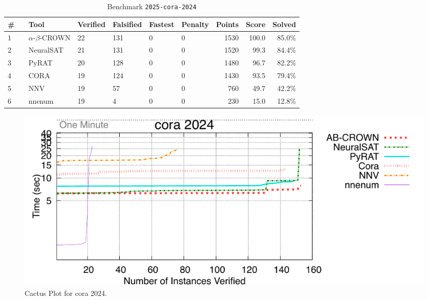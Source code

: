 \begin{table}[h]
\begin{center}
\caption{Benchmark \texttt{2025-cora-2024}} \label{tab:cat_2025_cora_2024}
{\setlength{\tabcolsep}{2pt}
\begin{tabular}[h]{@{}llllllrrr@{}}
\toprule
\textbf{\# ~} & \textbf{Tool} & \textbf{Verified} & \textbf{Falsified} & \textbf{Fastest} & \textbf{Penalty} & \textbf{Points} & \textbf{Score} & \textbf{Solved}\\
\midrule
1 & $\alpha$-$\beta$-CROWN & 22 & 131 & 0 & 0 & 1530 & 100.0 & 85.0\% \\
2 & NeuralSAT & 21 & 131 & 0 & 0 & 1520 & 99.3 & 84.4\% \\
3 & PyRAT & 20 & 128 & 0 & 0 & 1480 & 96.7 & 82.2\% \\
4 & CORA & 19 & 124 & 0 & 0 & 1430 & 93.5 & 79.4\% \\
5 & NNV & 19 & 57 & 0 & 0 & 760 & 49.7 & 42.2\% \\
6 & nnenum & 19 & 4 & 0 & 0 & 230 & 15.0 & 12.8\% \\
\bottomrule
\end{tabular}
}
\end{center}
\end{table}



\begin{figure}[h]
\centerline{\includegraphics[width=\textwidth]{cactus/2025_cora_2024.pdf}}
\caption{Cactus Plot for cora 2024.}
\label{fig:quantPic}
\end{figure}


\clearpage


